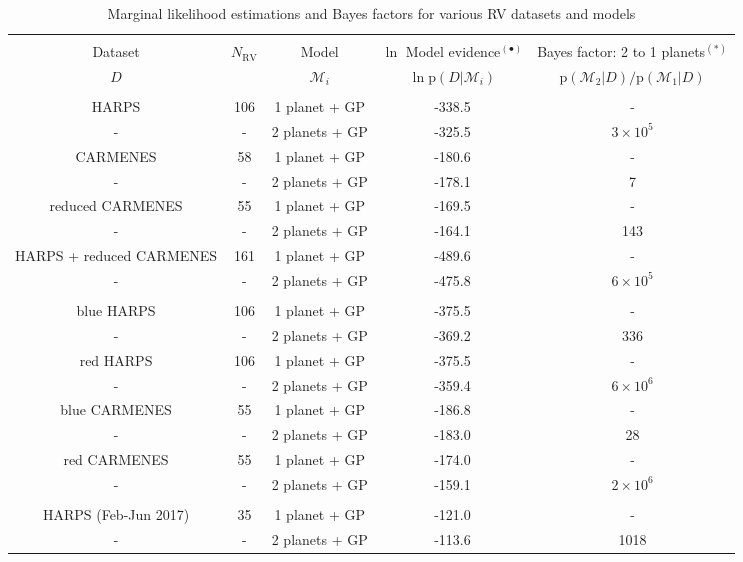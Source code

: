 \begin{table*}
\small
\renewcommand{\arraystretch}{0.7}
\centering
\caption{Marginal likelihood estimations and Bayes factors for various RV datasets and models}
\label{k2182table:perrakis}
\begin{tabular}{ccccc}
\hline \\ [-1ex]
Dataset & $N_{\text{RV}}$ & Model & $\ln$ Model evidence$^{(\bullet)}$ & Bayes factor: 2 to 1 planets$^{(\ast)}$ \\
$D$ & & $\mathcal{M}_i$ & $\ln{\text{p}(D|\mathcal{M}_i)}$ & $\text{p}(\mathcal{M}_2|D)/ \text{p}(\mathcal{M}_1|D)$ \smallskip \\
\hline \\ [-1ex]
HARPS & 106 & 1 planet + GP & -338.5 & - \\
- & - & 2 planets + GP & -325.5 & $3\times 10^5$ \\
CARMENES & 58 & 1 planet + GP & -180.6 & - \\
- & - & 2 planets + GP & -178.1 & 7 \\
reduced CARMENES & 55 & 1 planet + GP & -169.5 & - \\
- & - & 2 planets + GP & -164.1 & 143 \\
HARPS + reduced CARMENES & 161 & 1 planet + GP & -489.6 & - \\
- & - & 2 planets + GP & -475.8 & $6\times 10^5$ \\
\hline \\ [-1ex]
blue HARPS & 106 & 1 planet + GP & -375.5 & - \\
- & - & 2 planets + GP & -369.2 & 336 \\
red HARPS & 106 & 1 planet + GP & -375.5 & - \\
- & - & 2 planets + GP & -359.4 & $6\times 10^6$ \\
blue CARMENES & 55 & 1 planet + GP & -186.8 & - \\
- & - & 2 planets + GP & -183.0 & 28 \\
red CARMENES & 55 & 1 planet + GP & -174.0 & - \\
- & - & 2 planets + GP & -159.1 & $2\times 10^6$ \\
\hline \\ [-1ex]
HARPS (Feb-Jun 2017) & 35 & 1 planet + GP & -121.0 & - \\
- & - & 2 planets + GP & -113.6 & 1018 \\

\end{tabular}
\end{table*}
